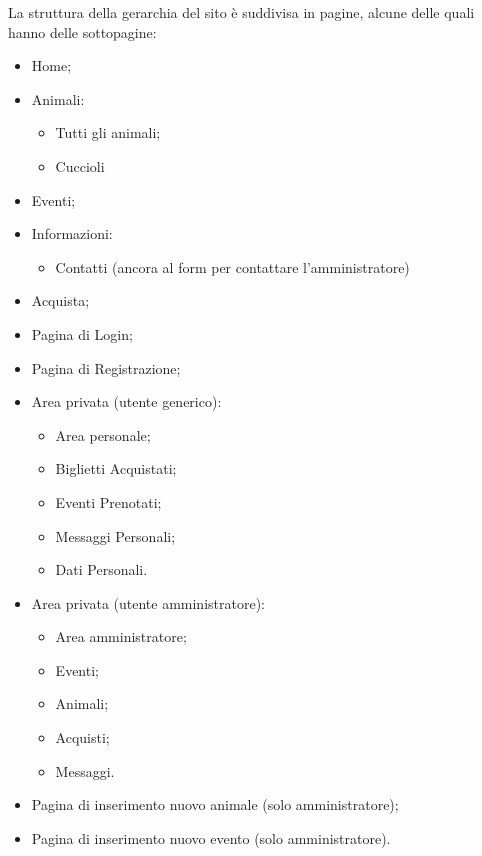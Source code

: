     La struttura della gerarchia del sito è suddivisa in pagine, alcune delle quali hanno delle sottopagine:
    \begin{itemize}
        \item Home;
        \item Animali:
            \begin{itemize}
                \item Tutti gli animali;
                \item Cuccioli
            \end{itemize}
        \item Eventi;
        \item Informazioni:
            \begin{itemize}
                \item Contatti (ancora al form per contattare l'amministratore)
            \end{itemize}
        \item Acquista;
        \item Pagina di Login;
        \item Pagina di Registrazione;
        \item Area privata (utente generico):
            \begin{itemize}
                \item Area personale;
                \item Biglietti Acquistati;
                \item Eventi Prenotati;
                \item Messaggi Personali;
                \item Dati Personali.
            \end{itemize}
            \item Area privata (utente amministratore):
                \begin{itemize}
                    \item Area amministratore;
                    \item Eventi;
                    \item Animali;
                    \item Acquisti;
                    \item Messaggi.
                \end{itemize}
            \item Pagina di inserimento nuovo animale (solo amministratore);
            \item Pagina di inserimento nuovo evento (solo amministratore).
    \end{itemize}
